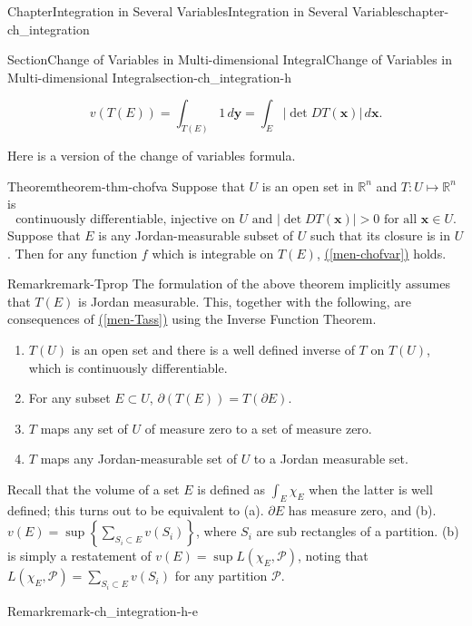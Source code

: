 \documentclass[oneside,10pt,]{book}
\newcommand{\xreffont}{\relax}
\numberwithin{equation}{section}
\newcommand{\bbR}{\mathbb{R}}
\newcommand{\cP}{\mathcal{P}}
\begin{document}
\begin{chapterptx}{Chapter}{Integration in Several Variables}{}{Integration in Several Variables}{}{}{chapter-ch_integration}
\begin{sectionptx}{Section}{Change of Variables in Multi-dimensional Integral}{}{Change of Variables in Multi-dimensional Integral}{}{}{section-ch_integration-h}
\begin{introduction}{}
\begin{equation}
v(T(E))=\int_{T(E)}1\, d{\mathbf y}= \int_{E} |\det DT({\mathbf x})|\, d{\mathbf x}.\label{men-volchange}
\end{equation}
%
\end{introduction}%
 Here is a version of the change of variables formula. \begin{theorem}{Theorem}{}{}{theorem-thm-chofva}%
Suppose that \(U\) is an open set in \(\bbR^{n}\) and \(T: U\mapsto \bbR^{n}\) is%
\begin{equation}
\text{continuously differentiable, injective on } U \text{ and } |\det DT({\mathbf x})| >0 \text{ for all } {\mathbf x}\in U.\label{men-Tass}
\end{equation}
Suppose that \(E\) is any Jordan-measurable subset of \(U\) such that its closure is in \(U\). Then for any function \(f\) which is integrable on \(T(E)\), \hyperref[men-chofvar]{({\xreffont\ref{men-chofvar}})} holds.\end{theorem}
\begin{remark}{Remark}{}{remark-Tprop}%
The formulation of the above theorem implicitly assumes that \(T(E)\) is Jordan measurable. This, together with the following, are consequences of  \hyperref[men-Tass]{({\xreffont\ref{men-Tass}})} using the Inverse Function Theorem. %
\begin{enumerate}[label=(\roman*)]
\item{}\(T(U)\) is an open set and there is a well defined inverse of \(T\) on \(T(U)\), which is continuously differentiable.%
\item{}For any  subset \(E\subset U\), \(\partial \left( T(E) \right) =T(\partial E)\).%
\item{}\(T\) maps any set of \(U\) of measure zero to a set of measure zero.%
\item{}\(T\) maps any Jordan-measurable set of \(U\) to a Jordan measurable set.%
\end{enumerate}
 Recall that the volume of a set \(E\) is defined as \(\int_{E}\chi_{E}\) when the latter is well defined; this turns out to be equivalent to (a). \(\partial E\) has measure zero, and (b). \(v(E)=\sup\left\{\sum_{S_{i} \subset E}v(S_{i})\right\}\), where \(S_{i}\) are sub rectangles of a partition. (b) is simply a restatement of \(v(E)=\sup L(\chi_{E}, \cP)\), noting that \(L(\chi_{E}, \cP)= \sum_{S_{i} \subset E}v(S_{i})\) for any partition \(\cP\).\end{remark}
\begin{remark}{Remark}{}{remark-ch_integration-h-e}%

\end{remark}
\end{sectionptx}
\end{chapterptx}
\end{document}
